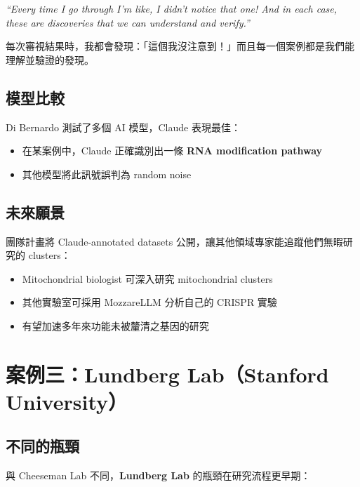\documentclass[12pt,a4paper]{article}
\begin{document}
\begin{tcolorbox}[
    colback=emergency_blue!5!white,
    colframe=emergency_blue,
    title=\textbf{Cheeseman 的評價},
    fonttitle=\bfseries
]
\textit{``Every time I go through I'm like, I didn't notice that one! And in each case, these are discoveries that we can understand and verify.''}

每次審視結果時，我都會發現：「這個我沒注意到！」而且每一個案例都是我們能理解並驗證的發現。
\end{tcolorbox}

\subsection{模型比較}

Di Bernardo 測試了多個 AI 模型，Claude 表現最佳：
\begin{itemize}
    \item 在某案例中，Claude 正確識別出一條 \textbf{RNA modification pathway}
    \item 其他模型將此訊號誤判為 random noise
\end{itemize}

\subsection{未來願景}

團隊計畫將 Claude-annotated datasets 公開，讓其他領域專家能追蹤他們無暇研究的 clusters：
\begin{itemize}
    \item Mitochondrial biologist 可深入研究 mitochondrial clusters
    \item 其他實驗室可採用 MozzareLLM 分析自己的 CRISPR 實驗
    \item 有望加速多年來功能未被釐清之基因的研究
\end{itemize}

\section{案例三：Lundberg Lab（Stanford University）}

\subsection{不同的瓶頸}

與 Cheeseman Lab 不同，\textbf{Lundberg Lab} 的瓶頸在研究流程更早期：
\end{document}
